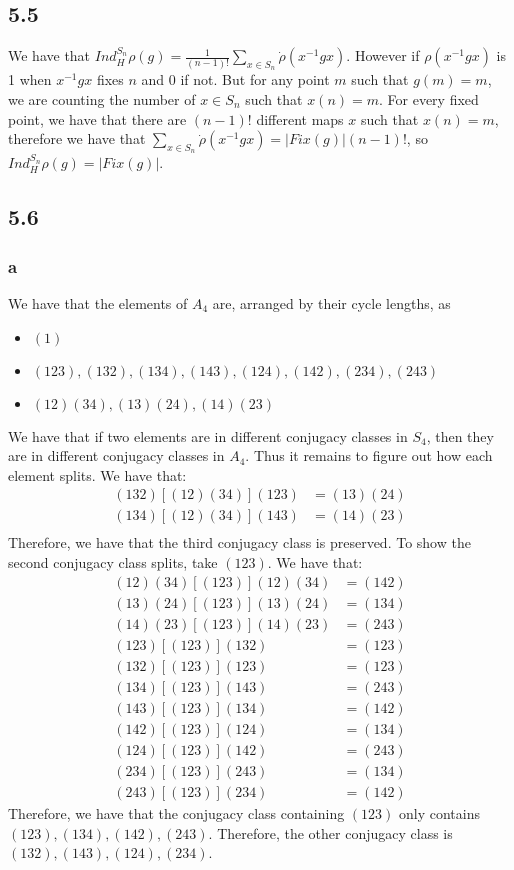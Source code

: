 \documentclass[]{article}
\begin{document}
\subsection*{5.5}
We have that $Ind_H^{S_n} \rho(g) = \frac{1}{(n-1)!} \sum_{x \in S_n}\dot{\rho}(x^{-1} g x)$. However if $\rho(x^{-1} g x)$ is 1 when $x^{-1} g x$ fixes $n$ and $0$ if not. But for any point $m$ such that $g(m) = m$, we are counting the number of $x \in S_n$ such that $x(n) = m$. For every fixed point, we have that there are $(n-1)!$ different maps $x$ such that $x(n) = m$, therefore we have that $\sum_{x \in S_n}\dot{\rho}(x^{-1} g x) = |Fix(g)| (n-1)!$, so $Ind_H^{S_n} \rho(g) = |Fix(g)|$.

\subsection*{5.6}
\subsubsection*{a}
We have that the elements of $A_4$ are, arranged by their cycle lengths, as
\begin{itemize}
	\item $(1)$
	\item $(123), (132), (134), (143), (124), (142), (234), (243)$
	\item $(12)(34), (13)(24), (14)(23)$
\end{itemize}
We have that if two elements are in different conjugacy classes in $S_4$, then they are in different conjugacy classes in $A_4$. Thus it remains to figure out how each element splits. We have that:
\begin{align*}
	(132) [(12)(34)](123) &= (13)(24)\\
	(134)[(12)(34)](143) &= (14)(23)\\
\end{align*}
Therefore, we have that the third conjugacy class is preserved. To show the second conjugacy class splits, take $(123)$. We have that:
\begin{align*}
	(12)(34) [(123)] (12)(34) &= (142)\\
	(13)(24) [(123)] (13)(24) &= (134)\\
	(14)(23) [(123)] (14)(23) &= (243)\\
	(123)[(123)](132) &= (123)\\
	(132)[(123)](123) &= (123)\\
	(134)[(123)](143) &= (243)\\
	(143) [(123)] (134) &= (142)\\
	(142)[(123)] (124) &= (134)\\
	(124)[(123)](142) &= (243)\\
	(234)[(123)](243) &= (134)\\
	(243)[(123)](234) &= (142)
\end{align*}
Therefore, we have that the conjugacy class containing $(123)$ only contains $(123), (134), (142), (243)$. Therefore, the other conjugacy class is $(132), (143), (124), (234)$. 
\end{document}
